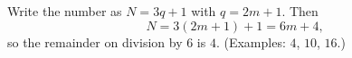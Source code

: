 Write the number as $N=3q+1$ with $q=2m+1$. Then
\[N=3(2m+1)+1=6m+4,\]
so the remainder on division by $6$ is $\boxed{4}$. (Examples: $4$, $10$, $16$.)
